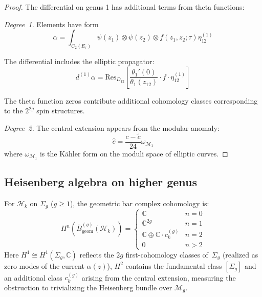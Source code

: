 \begin{proof}
The differential on genus 1 has additional terms from theta functions:

\emph{Degree~1.} Elements have form
\[
\alpha = \int_{C_2(E_\tau)} \psi(z_1) \otimes \psi(z_2) \otimes f(z_1, z_2; \tau)\eta_{12}^{(1)}
\]

The differential includes the elliptic propagator:
\[
d^{(1)}\alpha = \text{Res}_{D_{12}}\left[\frac{\theta_1'(0)}{\theta_1(z_{12})} \cdot f \cdot \eta_{12}^{(1)}\right]
\]

The theta function zeros contribute additional cohomology classes corresponding to the $2^{2g}$ spin structures.

\emph{Degree~2.} The central extension appears from the modular anomaly:
\[
\hat{c} = \frac{c - \tilde{c}}{24}\omega_{\mathcal{M}_1}
\]
where $\omega_{\mathcal{M}_1}$ is the Kähler form on the moduli space of elliptic curves.
\end{proof}

\subsection{Heisenberg algebra on higher genus}

\begin{theorem}\label{thm:heisenberg-higher-genus}
For $\mathcal{H}_k$ on $\Sigma_g$ ($g \geq 1$), the geometric bar complex cohomology is:
\[
H^n(\bar{B}_{\mathrm{geom}}^{(g)}(\mathcal{H}_k)) = \begin{cases}
\mathbb{C} & n = 0 \\
\mathbb{C}^{2g} & n = 1 \\
\mathbb{C} \oplus \mathbb{C} \cdot c_k^{(g)} & n = 2 \\
0 & n > 2
\end{cases}
\]
Here $H^1 \cong H^1(\Sigma_g, \mathbb{C})$ reflects the $2g$ first-cohomology classes of~$\Sigma_g$ (realized as zero modes of the current $\alpha(z)$), $H^2$ contains the fundamental class $[\Sigma_g]$ and an additional class $c_k^{(g)}$ arising from the central extension, measuring the obstruction to trivializing the Heisenberg bundle over $\mathcal{M}_g$.
\end{theorem}

